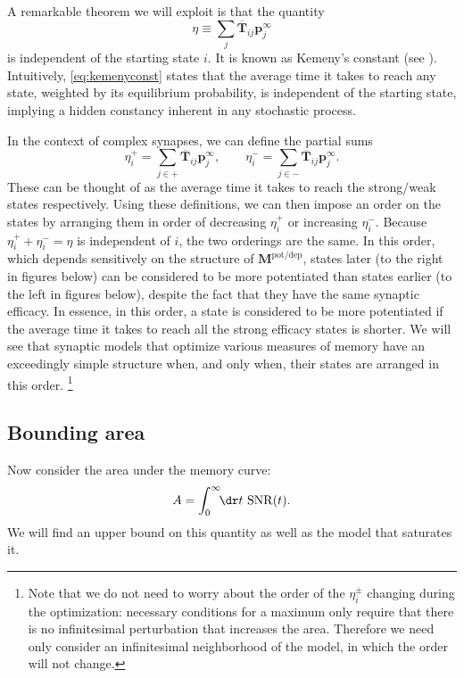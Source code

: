 \documentclass{article} %
\DeclareMathOperator{\snr}{SNR}
\newcommand{\pr}{\mathbf{p}}
\newcommand{\eq}{\pr^\infty}
\newcommand{\fpt}{\mathbf{T}}
\newcommand{\fptb}{\overline{\fpt}}
\newcommand{\M}{\mathbf{M}}
\newcommand{\potdep}{^{\text{pot/dep}}}
\begin{document}
A remarkable theorem we will exploit is that the quantity
%
\begin{equation}\label{eq:kemenyconst}
  \eta \equiv \sum_j \fptb_{ij}\eq_j
\end{equation}
%
is independent of the starting state $i$.
It is known as Kemeny's constant (see \cite[\S4.4]{kemeny1960finite}).
Intuitively, \eqref{eq:kemenyconst} states that the average time it takes to reach any state, weighted by its equilibrium probability, is independent of the starting state, implying a hidden constancy inherent in any stochastic process.

In the context of complex synapses, we can define the partial sums
%
\begin{equation}\label{eq:kemenypm}
   \eta^+_i = \sum_{j\in+} \fptb_{ij} \eq_j,
   \qquad
   \eta^-_i = \sum_{j\in-} \fptb_{ij} \eq_j.
\end{equation}
%
These can be thought of as the average time it takes to reach the strong/weak states respectively.
Using these definitions, we can then impose an order on the states by arranging them in order of decreasing $\eta^+_i$ or increasing $\eta^-_i$.
Because $\eta^+_i+\eta^-_i=\eta$ is independent of $i$, the two orderings are the same.
In this order, which depends sensitively on the structure of $\M\potdep$, states later (to the right in figures below) can be considered to be more potentiated than states earlier (to the left in figures below), despite the fact that they have the same synaptic efficacy.
In essence, in this order, a state is considered to be more potentiated if the average time it takes to reach all the strong efficacy states is shorter.
We will see that synaptic models that optimize various measures of memory have an exceedingly simple structure when, and only when, their states are arranged in this order.%
\footnote{Note that we do not need to worry about the order of the $\eta^\pm_i$ changing during the optimization: necessary conditions for a maximum only require that there is no infinitesimal perturbation that increases the area. Therefore we need only consider an infinitesimal neighborhood of the model, in which the order will not change.}



\subsection{Bounding area}\label{sec:area}

Now consider the area under the memory curve:
%
\begin{equation}\label{eq:area}
  A = \int_0^\infty\!\!\dr t \, \snr(t).
\end{equation}
%
We will find an upper bound on this quantity as well as the model that saturates it.
\end{document}
